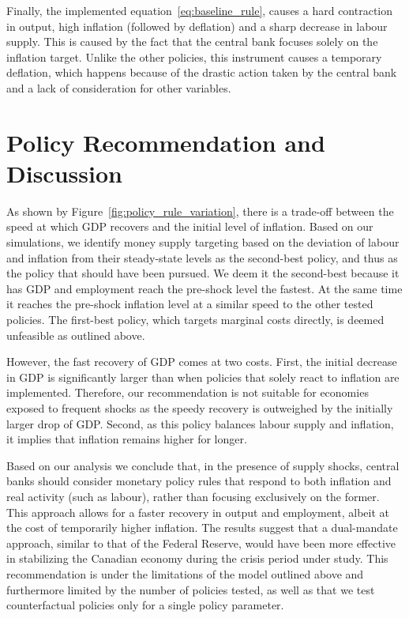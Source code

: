 \documentclass[12pt]{article}
\begin{document}
Finally, the implemented equation~\ref{eq:baseline_rule}, causes a hard contraction in output, high inflation (followed by deflation) and a sharp decrease in labour supply. This is caused by the fact that the central bank focuses solely on the inflation target. Unlike the other policies, this instrument causes a temporary deflation, which happens because of the drastic action taken by the central bank and a lack of consideration for other variables.




\section{Policy Recommendation and Discussion }\label{s:discussion}

As shown by Figure~\ref{fig:policy_rule_variation}, there is a trade-off between the speed at which GDP recovers and the initial level of inflation. Based on our simulations, we identify money supply targeting based on the deviation of labour and inflation from their steady-state levels as the second-best policy, and thus as the policy that should have been pursued. We deem it the second-best because it has GDP and employment reach the pre-shock level the fastest. At the same time it reaches the pre-shock inflation level at a similar speed to the other tested policies. The first-best policy, which targets marginal costs directly, is deemed unfeasible as outlined above. 

However, the fast recovery of GDP comes at two costs. First, the initial decrease in GDP is significantly larger than when policies that solely react to inflation are implemented. Therefore, our recommendation is not suitable for economies exposed to frequent shocks as the speedy recovery is outweighed by the initially larger drop of GDP. Second, as this policy balances labour supply and inflation, it implies that inflation remains higher for longer.  

Based on our analysis we conclude that, in the presence of supply shocks, central banks should consider monetary policy rules that respond to both inflation and real activity (such as labour), rather than focusing exclusively on the former. This approach allows for a faster recovery in output and employment, albeit at the cost of temporarily higher inflation. The results suggest that a dual-mandate approach, similar to that of the Federal Reserve, would have been more effective in stabilizing the Canadian economy during the crisis period under study. This recommendation is under the limitations of the model outlined above and furthermore limited by the number of policies tested, as well as that we test counterfactual policies only for a single policy parameter. 
\end{document}

